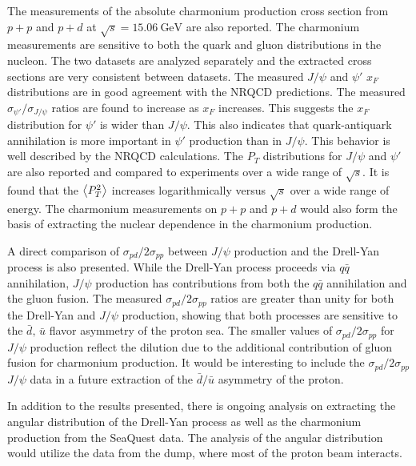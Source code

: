 \documentclass[../main.tex]{subfiles}
\begin{document}
The measurements of the absolute charmonium production cross section from $p+p$
and $p+d$ at $\sqrt{s}=\SI{15.06}{\GeV}$ are also reported. The charmonium measurements
are sensitive to both the quark and gluon distributions in the nucleon. The two datasets
are analyzed separately and the extracted cross sections are very consistent between datasets.
The measured $J/\psi$ and $\psi'$ $x_F$ distributions are in good agreement with the NRQCD predictions.
The measured $\sigma_{\psi'}/\sigma_{J/\psi}$ ratios are found to increase as $x_F$ increases.
This suggests the $x_F$ distribution for $\psi'$ is wider than $J/\psi$.
This also indicates that quark-antiquark annihilation is more important in $\psi'$ production than in $J/\psi$.
This behavior is well described by the NRQCD calculations.
The $P_T$ distributions for $J/\psi$ and $\psi'$ are also reported and compared to experiments over a wide range of $\sqrt{s}$.
It is found that the $\expval{P_T^2}$ increases logarithmically versus $\sqrt{s}$ over a wide range of energy.
The charmonium measurements on $p+p$ and $p+d$ would also form the basis of
extracting the nuclear dependence in the charmonium production.

A direct comparison of $\sigma_{pd}/2\sigma_{pp}$
between $J/\psi$ production and the Drell-Yan process is also presented. 
While the Drell-Yan process proceeds via $q \bar{q}$ annihilation,
$J/\psi$ production has contributions from both the $q \bar{q}$ annihilation and the gluon fusion.
The measured $\sigma_{pd}/2\sigma_{pp}$ ratios are greater than unity for both the Drell-Yan and $J/\psi$ production,
showing that both processes are sensitive to the $\bar{d},\,\bar{u}$ flavor asymmetry of the proton sea.
The smaller values of $\sigma_{pd}/2\sigma_{pp}$ for $J/\psi$
production reflect the dilution due to the additional contribution
of gluon fusion for charmonium production. 
It would be interesting to include the $\sigma_{pd}/2\sigma_{pp}$ $J/\psi$ data in a future
extraction of the $\bar{d}/ \bar{u}$ asymmetry of the proton. 

In addition to the results presented, there is ongoing analysis on extracting
the angular distribution of the Drell-Yan process as well as the charmonium
production from the SeaQuest data. The analysis of the angular distribution would
utilize the data from the dump, where most of the proton beam interacts.
\end{document}
